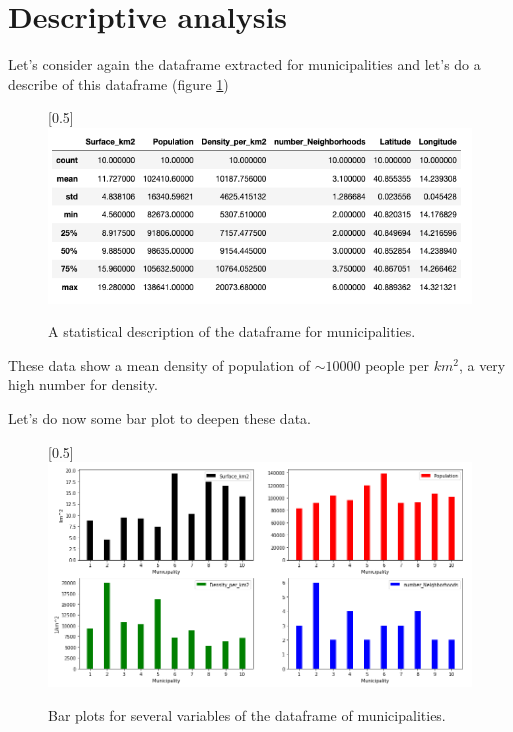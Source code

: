 \documentclass[a4paper, 12pt, oneside]{book}
\begin{document}
\section*{Descriptive analysis}
\label{sec:descr_analysis}
Let's consider again the dataframe extracted for municipalities and let's do a describe of this dataframe (figure \ref{fig:describe})



\begin{figure}[!htb]
		\centering
		\scalebox{0.45}[0.5]{\includegraphics{immagini/describe.png}}
		\caption{A statistical description of the dataframe for municipalities.}
		\label{fig:describe}
	\end{figure}


These data show a mean density of population of $\sim 10000$ people per $km^2$, a very high number for density.

Let's do now some bar plot to deepen these data. 


\begin{figure}[!htb]
		\centering
		\scalebox{0.45}[0.5]{\includegraphics{immagini/barplots.png}}
		\caption{Bar plots for several variables of the dataframe of municipalities.}
		\label{fig:barplots}
	\end{figure}
\end{document}
